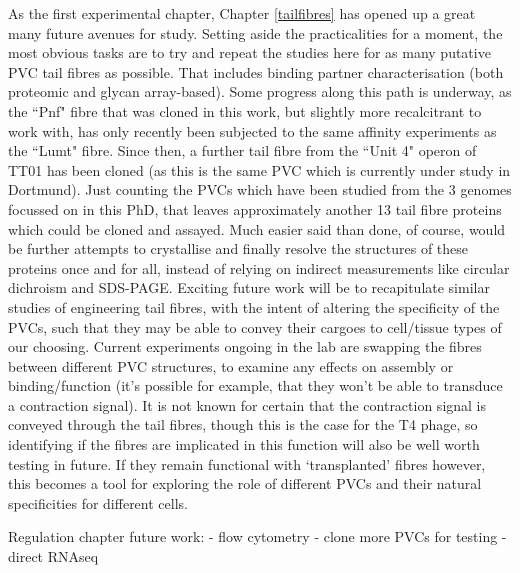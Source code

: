 As the first experimental chapter, Chapter \ref{tailfibres} has opened up a great many future avenues for study. Setting aside the practicalities for a moment, the most obvious tasks are to try and repeat the studies here for as many putative PVC tail fibres as possible. That includes binding partner characterisation (both proteomic and glycan array-based). Some progress along this path is underway, as the ``Pnf" fibre that was cloned in this work, but slightly more recalcitrant to work with, has only recently been subjected to the same affinity experiments as the ``Lumt" fibre. Since then, a further tail fibre from the ``Unit 4" operon of \Pasy{} TT01 has been cloned (as this is the same PVC which is currently under study in Dortmund). Just counting the PVCs which have been studied from the 3 genomes focussed on in this PhD, that leaves approximately another 13 tail fibre proteins which could be cloned and assayed. Much easier said than done, of course, would be further attempts to crystallise and finally resolve the structures of these proteins once and for all, instead of relying on indirect measurements like circular dichroism and SDS-PAGE. Exciting future work will be to recapitulate similar studies of engineering tail fibres, with the intent of altering the specificity of the PVCs, such that they may be able to convey their cargoes to cell/tissue types of our choosing. Current experiments ongoing in the lab are swapping the fibres between different PVC structures, to examine any effects on assembly or binding/function (it's possible for example, that they won't be able to transduce a contraction signal). It is not known for certain that the contraction signal is conveyed through the tail fibres, though this is the case for the T4 phage, so identifying if the fibres are implicated in this function will also be well worth testing in future. If they remain functional with `transplanted' fibres however, this becomes a tool for exploring the role of different PVCs and their natural specificities for different cells.


Regulation chapter future work:
 - flow cytometry
 - clone more PVCs for testing
 - direct RNAseq
